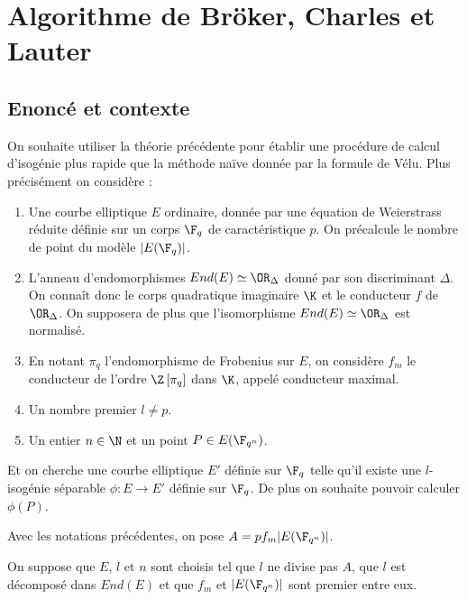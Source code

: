 
	
\section{Algorithme de Bröker, Charles et Lauter}

\subsection{Enoncé et contexte}

On souhaite utiliser la théorie précédente pour établir une procédure de calcul d'isogénie plus rapide que la méthode naïve donnée par la formule de Vélu. Plus précisément on considère :
\begin{enumerate}
	\item Une courbe elliptique $E$ ordinaire, donnée par une équation de Weierstrass réduite définie sur un corps $\F_{q}$ de caractéristique $p$. On précalcule le nombre de point du modèle $|E(\F_{q})|$.
	\item L'anneau d'endomorphismes $End(E)\simeq\OR_{\Delta}$ donné par son discriminant $\Delta$. On connaît donc le corps quadratique imaginaire $\K$ et le conducteur $f$ de $\OR_{\Delta}$. On supposera de plus que l'isomorphisme $End(E)\simeq\OR_{\Delta}$ est normalisé. 
	\item En notant $\pi_{q}$ l'endomorphisme de Frobenius sur $E$, on considère $f_{m}$ le conducteur de l'ordre $\Z\left[ \pi_{q}\right]$ dans $\K$, appelé conducteur maximal. 
	\item Un nombre premier $l\neq p$.
	\item Un entier $n\in\N$ et un point $P\in E(\F_{q^{n}})$. 
\end{enumerate} 

Et on cherche une courbe elliptique $E'$ définie sur $\F_{q}$ telle qu'il existe une $l$-isogénie séparable $\phi : E\rightarrow E'$ définie sur $\F_{q}$. De plus on souhaite pouvoir calculer $\phi(P)$. 

\begin{Def}
	Avec les notations précédentes, on pose $A = pf_{m}|E(\F_{q^{n}})|$.
\end{Def}

\begin{Hyp}
	On suppose que $E$, $l$ et $n$ sont choisis tel que $l$ ne divise pas $A$, que $l$ est décomposé dans $End(E)$ et que $f_{m}$ et $|E(\F_{q^{n}})|$ sont premier entre eux.
\end{Hyp}


